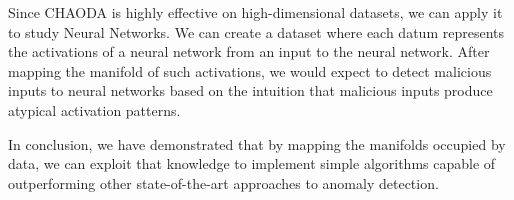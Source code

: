 Since CHAODA is highly effective on high-dimensional datasets, we can apply it to study Neural Networks.
We can create a dataset where each datum represents the activations of a neural network from an input to the neural network.
After mapping the manifold of such activations, we would expect to detect malicious inputs to neural networks based on the intuition that malicious inputs produce atypical activation patterns.


In conclusion, we have demonstrated that by mapping the manifolds occupied by data, we can exploit that knowledge to implement simple algorithms capable of outperforming other state-of-the-art approaches to anomaly detection.

